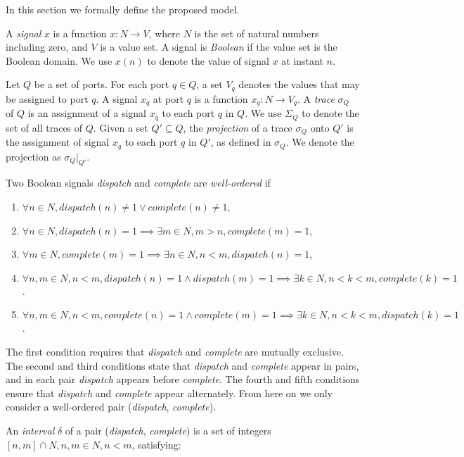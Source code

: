 In this section we formally define the proposed model.

\bigskip
{}
A \emph{signal} $x$ is a function $x: N \rightarrow V$, where $N$ is the set of natural numbers including zero, and $V$ is a value set. 
A signal is \emph{Boolean} if the value set is the Boolean domain.
We use $x(n)$ to denote the value of signal $x$ at instant $n$. 

\bigskip
{}
Let $Q$ be a set of ports. 
For each port $q \in Q$, a set $V_q$ denotes the values that may be assigned to port $q$. 
A signal $x_q$ at port $q$ is a function $x_q: N \rightarrow V_q$.
A \emph{trace} $\sigma_Q$ of $Q$ is an assignment of a signal $x_q$ to each port $q$ in $Q$.
We use $\Sigma_Q$ to denote the set of all traces of $Q$.
Given a set $Q' \subseteq Q$, the \emph{projection} of a trace $\sigma_Q$ onto $Q'$ is the assignment of signal $x_q$ to each port $q$ in $Q'$, as defined in $\sigma_Q$. We denote the projection as $\sigma_Q|_{Q'}$.

\bigskip 
{}
Two Boolean signals \emph{dispatch} and \emph{complete} are \emph{well-ordered} if 

\begin{enumerate}
	\item $\forall n \in N, dispatch(n) \ne 1 \vee complete(n) \ne 1 $,
	\item $ \forall n\in N, dispatch(n) = 1 \implies \exists m\in N, m > n, complete(m) =  1 $,
	\item $ \forall m\in N, complete(m) = 1 \implies \exists n\in N, n < m, dispatch(n) =  1 $,
	\item $ \forall n,m\in N, n < m, dispatch(n) = 1 \wedge dispatch(m) = 1 \implies \exists k\in N, n < k < m, complete(k) = 1 $.
	\item $ \forall n,m\in N, n < m, complete(n) = 1 \wedge complete(m) = 1 \implies \exists k\in N, n < k < m, dispatch(k) = 1 $.
\end{enumerate}

The first condition requires that \emph{dispatch} and \emph{complete} are mutually exclusive. The second and third conditions state that \emph{dispatch} and \emph{complete} appear in pairs, and in each pair \emph{dispatch} appears before \emph{complete}. The fourth and fifth conditions ensure that \emph{dispatch} and \emph{complete} appear alternately. 
From here on we only consider a well-ordered pair (\emph{dispatch}, \emph{complete}).

An \emph{interval} $\delta$ of a pair (\emph{dispatch}, \emph{complete}) is a set of integers $[n, m] \cap N, n,m \in N, n < m$, satisfying:

